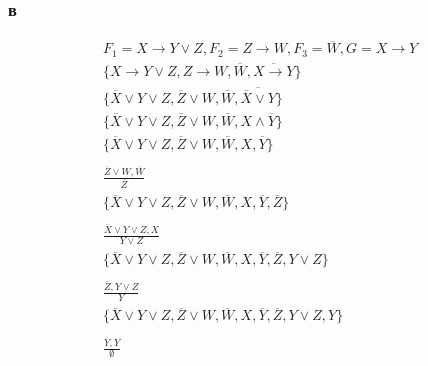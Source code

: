 \documentclass[12pt]{article}
\begin{document}
\subsubsection{в}
\begin{gather*}
  F_1 = X \rightarrow Y \vee Z, F_2 = Z \rightarrow W, F_3 = \overline{W}, G = X \rightarrow Y \\
  \{ X \rightarrow Y \vee Z, Z \rightarrow W, \overline{W}, \overline{ X \rightarrow Y} \} \\
  \{ \overline{X} \vee Y \vee Z, \overline{Z} \vee W, \overline{W}, \overline{ \overline{X} \vee Y} \} \\
  \{ \overline{X} \vee Y \vee Z, \overline{Z} \vee W, \overline{W}, X \wedge \overline{Y} \} \\
  \{ \overline{X} \vee Y \vee Z, \overline{Z} \vee W, \overline{W}, X, \overline{Y} \} \\
  \\
  \frac{\overline{Z} \vee W, \overline{W}}{\overline{Z}} \\
  \{ \overline{X} \vee Y \vee Z, \overline{Z} \vee W, \overline{W}, X, \overline{Y}, \overline{Z} \} \\
  \\
  \frac{\overline{X} \vee Y \vee Z, X}{Y \vee Z} \\
  \{ \overline{X} \vee Y \vee Z, \overline{Z} \vee W, \overline{W}, X, \overline{Y}, \overline{Z}, Y \vee Z \} \\
  \\
  \frac{\overline{Z}, Y \vee Z}{Y} \\
  \{ \overline{X} \vee Y \vee Z, \overline{Z} \vee W, \overline{W}, X, \overline{Y}, \overline{Z}, Y \vee Z, Y\} \\
  \\
  \frac{\overline{Y}, Y}{\emptyset} \\
\end{gather*}
\end{document}
